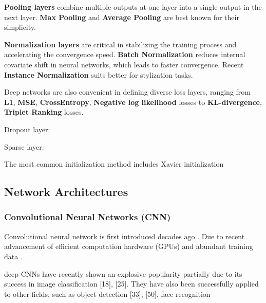 \textbf{Pooling layers} combine multiple outputs at one layer into a single output in the next layer. \textbf{Max Pooling} and \textbf{Average Pooling} \cite{Scherer:2010:EPO:1886436.1886447} are best known for their simplicity. 


\textbf{Normalization layers} are critical in stabilizing the training process and accelerating the convergence speed. \textbf{Batch Normalization} \cite{icml2015_ioffe15} reduces internal covariate shift in neural networks, which leads to faster convergence. Recent \textbf{Instance Normalization} \cite{Ulyanov2016InstanceNT} suits better for stylization tasks. 


Deep networks are also convenient in defining diverse loss layers, ranging from \textbf{L1}, \textbf{MSE}, \textbf{CrossEntropy}, \textbf{Negative log likelihood} losses to \textbf{KL-divergence}, \textbf{Triplet Ranking} losses. 


Dropout layer: 

Sparse layer: 





The most common initialization method includes 
Xavier initialization \cite{GlorotAISTATS2010}





\subsection{Network Architectures}
\label{ssec:architecture}

\subsubsection{Convolutional Neural Networks (CNN)} \hfill 

Convolutional neural network is first introduced decades ago \cite{LeCun:1989:BAH:1351079.1351090}. Due to recent advancement of efficient computation hardware (GPUs) and abundant training data \cite{imagenet}. 

\cite{NIPS2012_4824}

deep CNNs have recently shown an explosive popularity
partially due to its success in image classification [18], [25].
They have also been successfully applied to other fields, such as object detection [33], [50], face recognition




